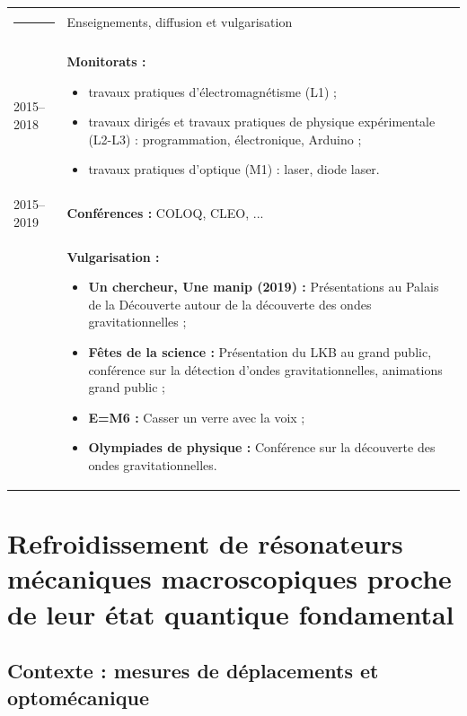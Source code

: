\documentclass[12pt,a4paper]{article}
\begin{document}
\begin{tabular*}{\textwidth}{p{}<{\raggedleft}p{}}
\textcolor{theme}{\rule{0.12\textwidth}{2.5mm}} &
\large\textcolor{theme}{Enseignements, diffusion et vulgarisation} \vspace{3pt} \\
2015--2018 & \textbf{Monitorats :}
\begin{itemize}
\item travaux pratiques d'électromagnétisme (L1) ;
\item travaux dirigés et travaux pratiques de physique expérimentale (L2-L3) : programmation, électronique, Arduino ;
\item travaux pratiques d'optique (M1) : laser, diode laser.
\end{itemize}\\
2015--2019 &
\textbf{Conférences :} COLOQ, CLEO, ... \vspace{3pt} \\
& \textbf{Vulgarisation :}
\begin{itemize}
\item \textbf{Un chercheur, Une manip (2019) :} Présentations au Palais de la Découverte autour de la découverte des ondes gravitationnelles ;
\item \textbf{Fêtes de la science :} Présentation du LKB au grand public, conférence sur la détection d'ondes gravitationnelles, animations grand public ;
\item \textbf{E=M6 :} Casser un verre avec la voix ;
\item \textbf{Olympiades de physique :} Conférence sur la découverte des ondes gravitationnelles.
\end{itemize}
\end{tabular*}

\section{Refroidissement de résonateurs mécaniques macroscopiques proche de leur état quantique fondamental}

\subsection{Contexte : mesures de déplacements et optomécanique}
\end{document}
